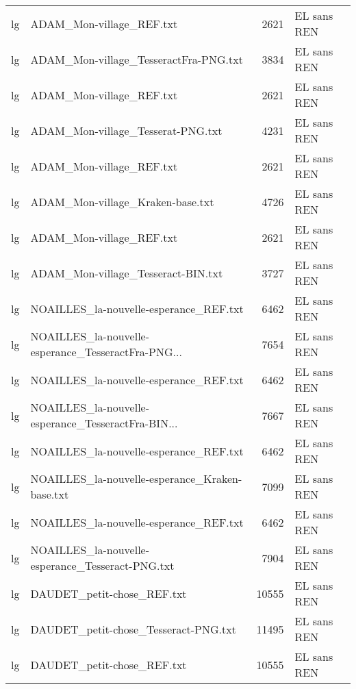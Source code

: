 \begin{tabular}{llrl}
    lg &                           ADAM\_Mon-village\_REF.txt &                  2621 & EL sans REN \\
    lg &              ADAM\_Mon-village\_TesseractFra-PNG.txt &                  3834 & EL sans REN \\
    lg &                           ADAM\_Mon-village\_REF.txt &                  2621 & EL sans REN \\
    lg &                  ADAM\_Mon-village\_Tesserat-PNG.txt &                  4231 & EL sans REN \\
    lg &                           ADAM\_Mon-village\_REF.txt &                  2621 & EL sans REN \\
    lg &                   ADAM\_Mon-village\_Kraken-base.txt &                  4726 & EL sans REN \\
    lg &                           ADAM\_Mon-village\_REF.txt &                  2621 & EL sans REN \\
    lg &                 ADAM\_Mon-village\_Tesseract-BIN.txt &                  3727 & EL sans REN \\
    lg &             NOAILLES\_la-nouvelle-esperance\_REF.txt &                  6462 & EL sans REN \\
    lg & NOAILLES\_la-nouvelle-esperance\_TesseractFra-PNG... &                  7654 & EL sans REN \\
    lg &             NOAILLES\_la-nouvelle-esperance\_REF.txt &                  6462 & EL sans REN \\
    lg & NOAILLES\_la-nouvelle-esperance\_TesseractFra-BIN... &                  7667 & EL sans REN \\
    lg &             NOAILLES\_la-nouvelle-esperance\_REF.txt &                  6462 & EL sans REN \\
    lg &     NOAILLES\_la-nouvelle-esperance\_Kraken-base.txt &                  7099 & EL sans REN \\
    lg &             NOAILLES\_la-nouvelle-esperance\_REF.txt &                  6462 & EL sans REN \\
    lg &   NOAILLES\_la-nouvelle-esperance\_Tesseract-PNG.txt &                  7904 & EL sans REN \\
    lg &                         DAUDET\_petit-chose\_REF.txt &                 10555 & EL sans REN \\
    lg &               DAUDET\_petit-chose\_Tesseract-PNG.txt &                 11495 & EL sans REN \\
    lg &                         DAUDET\_petit-chose\_REF.txt &                 10555 & EL sans REN \\

\end{tabular}
